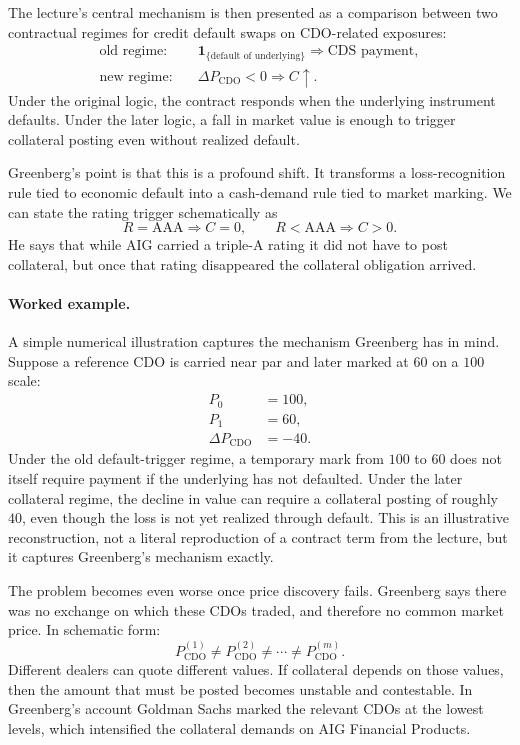 The lecture's central mechanism is then presented as a comparison between two contractual regimes for credit default swaps on CDO-related exposures:
\begin{align}
\text{old regime:} \quad & \mathbf{1}_{\{\text{default of underlying}\}}
\Rightarrow
\text{CDS payment},\\
\text{new regime:} \quad & \Delta P_{\mathrm{CDO}} < 0
\Rightarrow
C \uparrow.
\end{align}
Under the original logic, the contract responds when the underlying instrument defaults. Under the later logic, a fall in market value is enough to trigger collateral posting even without realized default.

Greenberg's point is that this is a profound shift. It transforms a loss-recognition rule tied to economic default into a cash-demand rule tied to market marking. We can state the rating trigger schematically as
\begin{equation}
R=\mathrm{AAA}
\Rightarrow
C=0,
\qquad
R<\mathrm{AAA}
\Rightarrow
C>0.
\end{equation}
He says that while AIG carried a triple-A rating it did not have to post collateral, but once that rating disappeared the collateral obligation arrived.

\paragraph{Worked example.}
A simple numerical illustration captures the mechanism Greenberg has in mind. Suppose a reference CDO is carried near par and later marked at \(60\) on a \(100\) scale:
\begin{align}
P_0 &= 100,\\
P_1 &= 60,\\
\Delta P_{\mathrm{CDO}} &= -40.
\end{align}
Under the old default-trigger regime, a temporary mark from \(100\) to \(60\) does not itself require payment if the underlying has not defaulted. Under the later collateral regime, the decline in value can require a collateral posting of roughly \(40\), even though the loss is not yet realized through default. This is an illustrative reconstruction, not a literal reproduction of a contract term from the lecture, but it captures Greenberg's mechanism exactly.

The problem becomes even worse once price discovery fails. Greenberg says there was no exchange on which these CDOs traded, and therefore no common market price. In schematic form:
\begin{equation}
P_{\mathrm{CDO}}^{(1)} \neq P_{\mathrm{CDO}}^{(2)} \neq \cdots \neq P_{\mathrm{CDO}}^{(m)}.
\end{equation}
Different dealers can quote different values. If collateral depends on those values, then the amount that must be posted becomes unstable and contestable. In Greenberg's account Goldman Sachs marked the relevant CDOs at the lowest levels, which intensified the collateral demands on AIG Financial Products.

